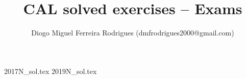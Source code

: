 \documentclass{cal}
\title{CAL solved exercises -- Exams}
\author{Diogo Miguel Ferreira Rodrigues (dmfrodrigues2000@gmail.com)}
\date{}
\begin{document}
\begingroup
\maketitle
    \let\clearpage\relax
	\tableofcontents
\endgroup
{2017N_sol.tex}
{2019N_sol.tex}
\end{document}
